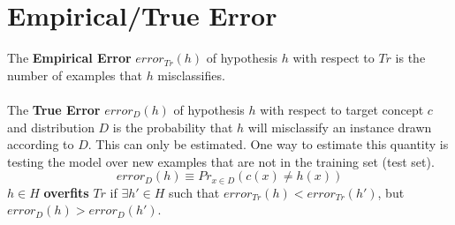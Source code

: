 \section{Empirical/True Error}
The \textbf{Empirical Error} $error_{Tr}(h)$ of hypothesis $h$ with respect to $Tr$ is the number of examples that $h$ misclassifies.\\\\
The \textbf{True Error} $error_D(h)$ of hypothesis $h$ with respect to target concept $c$ and distribution $D$ is the probability that $h$ will misclassify an instance drawn according to $D$. This can only be estimated. One way to estimate this quantity is testing the model over new examples that are not in the training set (test set).
\[error_D(h) \equiv Pr_{x \in D}(c(x) \neq h(x))\]
$h \in H$ \textbf{overfits} $Tr$ if $\exists h' \in H$ such that $error_{Tr}(h) < error_{Tr}(h')$, but $error_D(h) > error_D(h')$.

